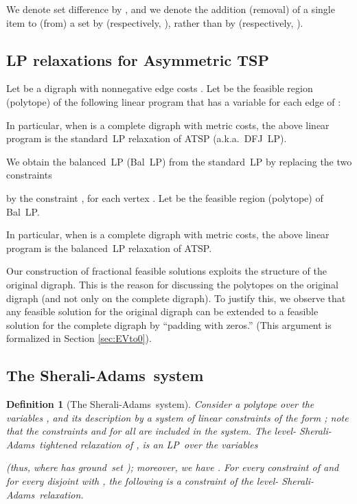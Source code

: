\documentclass[11pt]{article}
\newtheorem{definition}[theorem]{Definition}
\newcommand{\sa}{\textsf{Sherali-Adams}}
\newcommand{\tsp}{\textsc{TSP}}
\newcommand{\iLP}{\textsf{LP}}
\begin{document}
We denote set difference by , and
we denote the addition (removal) of a single item 
to (from) a set  by  (respectively, ),
rather than by  (respectively, ).


\subsection{LP relaxations for Asymmetric \tsp}\label{sec:atsp-relaxations}
\label{subsec:atsp-lp}

Let  be a digraph with nonnegative edge costs . Let
 be the feasible region (polytope) of the following
linear program that has a variable  for each edge  of :

In particular, when  is a complete digraph with metric costs, the
above linear program is the standard~LP relaxation of ATSP
(a.k.a.~DFJ~LP).

We obtain the balanced~LP (Bal~LP) from the standard~LP by
replacing the two constraints

by the constraint
,
for each vertex .
Let  be the feasible region (polytope) of Bal~LP.

In particular, when  is a complete digraph with metric costs, the
above linear program is the balanced~LP relaxation of ATSP.

Our construction of fractional feasible solutions exploits the
structure of the original digraph.
This is the reason for discussing the polytopes on the original digraph
(and not only on the complete digraph).
To justify this, we observe that any feasible solution for the original
digraph can be extended to a feasible solution for the complete digraph
by ``padding with zeros.'' (This argument is formalized in Section
\ref{sec:EVto0}).





\subsection{The \sa\ system}

\begin{definition}[The \sa\ system]\label{def:SA-definition}
Consider a polytope  over the variables
, and its description by a system of linear
constraints of the form ;
note that the constraints  and 
for all 
are included in the system.
The level- \sa\ tightened relaxation 
of , is an \iLP\ over the variables
 
(thus,  where
 has ground~set );
moreover, we have .
For every constraint 
of  and for every disjoint 
with , the following is a constraint of the
level- \sa\ relaxation.

\end{definition}
\end{document}
